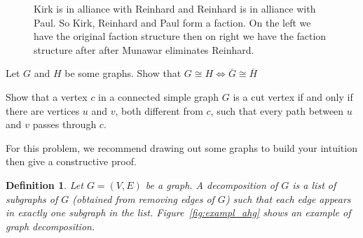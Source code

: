 \documentclass[a4paper]{exam}
\newtheorem{definition}{Definition}
\theoremstyle{claim}
\begin{document}
\begin{questions}
\begin{figure}[!tbh]
    \centering
    \caption{Kirk is in alliance with Reinhard and Reinhard is in alliance with Paul. So Kirk, Reinhard and Paul form a faction. On the left we have the original faction structure then on right we have the faction structure after after Munawar eliminates Reinhard.}
    \label{2}
\end{figure}


  \question Let $G$ and $H$ be some graphs. Show that $G \cong H \iff \overline{G} \cong \overline{H}$
  \begin{solution}
  \end{solution}

   \question Show that a vertex $c$ in a connected simple graph $G$ is a cut vertex if and only if there are vertices $u$ and $v$, both different from $c$, such that every path between $u$ and $v$ passes through $c$.
   \begin{solution}
  \end{solution}


  \question For this problem, we recommend drawing out some graphs to build your intuition then give a constructive proof.
    \begin{definition}
        Let $G = (V,E)$ be a graph. A decomposition of $G$ is a list of subgraphs of $G$ (obtained from removing edges of $G$) such that each edge appears in exactly one subgraph in the list. Figure~\ref{fig:exampl_ahg} shows an example of graph decomposition.
    \end{definition}


\end{questions}
\end{document}

